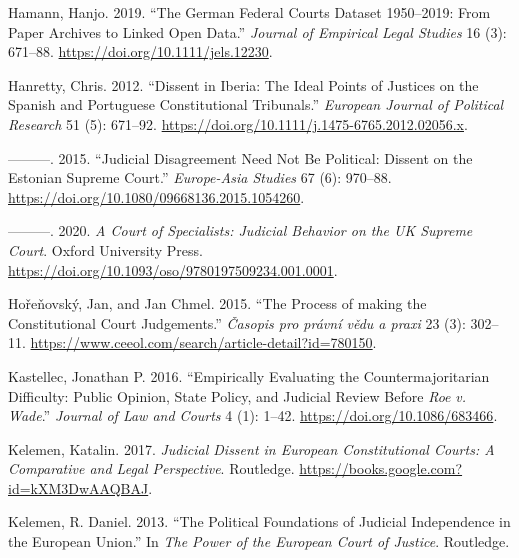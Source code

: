 \documentclass[
  11pt,
]{article}
\newlength{\cslhangindent}
\newenvironment{CSLReferences}[2] %
 {%
  \setlength{\parindent}{0pt}
  \ifodd #1 \everypar{\setlength{\hangindent}{\cslhangindent}}\ignorespaces\fi
  \ifnum #2 > 0
  \setlength{\parskip}{#2\baselineskip}
  \fi
 }%
 {}
\begin{document}
\begin{CSLReferences}{1}{0}
\leavevmode{}%
Hamann, Hanjo. 2019. {``The {German Federal Courts Dataset} 1950--2019:
{From Paper Archives} to {Linked Open Data}.''} \emph{Journal of
Empirical Legal Studies} 16 (3): 671--88.
\url{https://doi.org/10.1111/jels.12230}.

\leavevmode{}%
Hanretty, Chris. 2012. {``Dissent in {Iberia}: {The} Ideal Points of
Justices on the {Spanish} and {Portuguese Constitutional Tribunals}.''}
\emph{European Journal of Political Research} 51 (5): 671--92.
\url{https://doi.org/10.1111/j.1475-6765.2012.02056.x}.

\leavevmode{}%
---------. 2015. {``Judicial {Disagreement} Need Not Be {Political}:
{Dissent} on the {Estonian Supreme Court}.''} \emph{Europe-Asia Studies}
67 (6): 970--88. \url{https://doi.org/10.1080/09668136.2015.1054260}.

\leavevmode{}%
---------. 2020. \emph{A {Court} of {Specialists}: {Judicial Behavior}
on the {UK Supreme Court}}. Oxford University Press.
\url{https://doi.org/10.1093/oso/9780197509234.001.0001}.

\leavevmode{}%
Hořeňovský, Jan, and Jan Chmel. 2015. {``The Process of making the
Constitutional Court Judgements.''} \emph{Časopis pro právní vědu a
praxi} 23 (3): 302--11.
\url{https://www.ceeol.com/search/article-detail?id=780150}.

\leavevmode{}%
Kastellec, Jonathan P. 2016. {``Empirically {Evaluating} the
{Countermajoritarian Difficulty}: {Public Opinion}, {State Policy}, and
{Judicial Review} Before {\emph{Roe}}{ \emph{v.} }{\emph{Wade}}.''}
\emph{Journal of Law and Courts} 4 (1): 1--42.
\url{https://doi.org/10.1086/683466}.

\leavevmode{}%
Kelemen, Katalin. 2017. \emph{Judicial {Dissent} in {European
Constitutional Courts}: {A Comparative} and {Legal Perspective}}.
Routledge. \url{https://books.google.com?id=kXM3DwAAQBAJ}.

\leavevmode{}%
Kelemen, R. Daniel. 2013. {``The Political Foundations of Judicial
Independence in the {European Union}.''} In \emph{The {Power} of the
{European Court} of {Justice}}. Routledge.


\end{CSLReferences}
\end{document}

